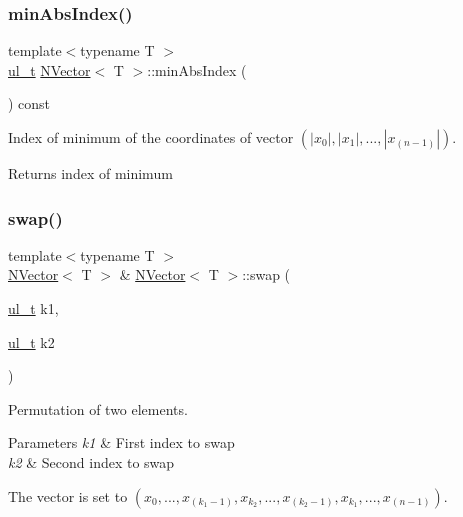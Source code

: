\subsubsection{\texorpdfstring{minAbsIndex()}{minAbsIndex()}}
{\footnotesize\ttfamily template$<$typename T $>$ \\
\mbox{\hyperlink{group___n_algebra_ga1b140a2034db3f5dfe18a987745df43a}{ul\+\_\+t}} \mbox{\hyperlink{class_n_vector}{N\+Vector}}$<$ T $>$\+::min\+Abs\+Index (\begin{DoxyParamCaption}{ }\end{DoxyParamCaption}) const}



Index of minimum of the coordinates of vector $ (|x_0|, |x_1|, ..., |x_{(n-1)}|) $. 

\begin{DoxyReturn}{Returns}
index of minimum 
\end{DoxyReturn}
\mbox{\label{class_n_vector_a8ea2e2cffa2c3053d835d05a571dac88}} 
\subsubsection{\texorpdfstring{swap()}{swap()}}
{\footnotesize\ttfamily template$<$typename T $>$ \\
\mbox{\hyperlink{class_n_vector}{N\+Vector}}$<$ T $>$ \& \mbox{\hyperlink{class_n_vector}{N\+Vector}}$<$ T $>$\+::swap (\begin{DoxyParamCaption}\item[{\mbox{\hyperlink{group___n_algebra_ga1b140a2034db3f5dfe18a987745df43a}{ul\+\_\+t}}}]{k1,  }\item[{\mbox{\hyperlink{group___n_algebra_ga1b140a2034db3f5dfe18a987745df43a}{ul\+\_\+t}}}]{k2 }\end{DoxyParamCaption})}



Permutation of two elements. 


\begin{DoxyParams}{Parameters}
{\em k1} & First index to swap \\
\hline
{\em k2} & Second index to swap\\
\hline
\end{DoxyParams}
The vector is set to $ (x_0, ..., x_{(k_1 - 1)}, x_{k_2}, ..., x_{(k_2 - 1)}, x_{k_1}, ..., x_{(n-1)}) $. \mbox{\label{class_n_vector_aabe8585ef2659ce3fa7872c2b96e3b20}} 
